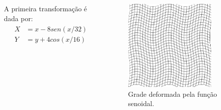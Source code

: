 \documentclass[t]{beamer}
\begin{document}
\begin{frame}
   \begin{columns}[c]
        A primeira transformação é dada por:
        \begin{align}
        \begin{split}
            X &= x - 8sen(x/32) \\
            Y &= y + 4cos(x/16)
        \end{split} 
        \end{align}
        \begin{figure}[!h]
          \begin{center}
            \includegraphics[width=0.8\textwidth]{figuras/gridSin.png}
            \caption{Grade deformada pela função senoidal.}
          \end{center}
        \end{figure}
    \end{columns}
\end{frame}
\end{document}
